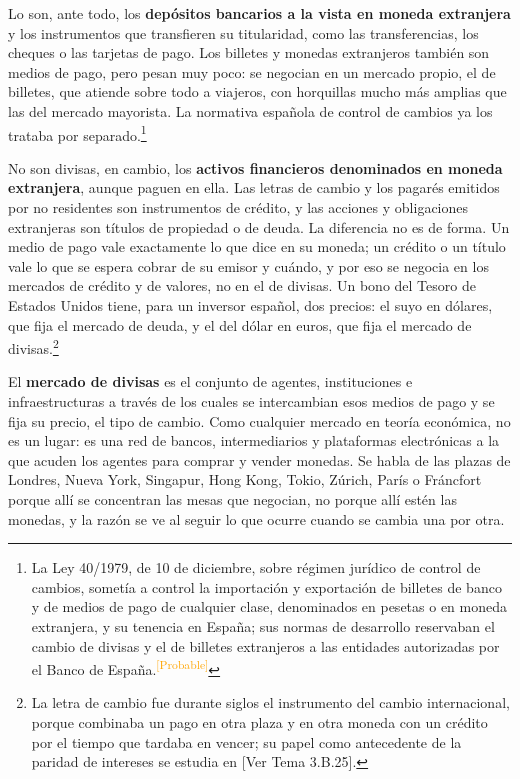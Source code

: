 \documentclass[10pt,a4paper]{article}
\newcommand{\authorfont}[1]{{\fontfamily{EBGaramond-TLF}\selectfont #1}}
\begin{document}
Lo son, ante todo, los \textbf{depósitos bancarios a la vista en moneda extranjera} y los instrumentos que transfieren su titularidad, como las transferencias, los cheques o las tarjetas de pago. Los billetes y monedas extranjeros también son medios de pago, pero pesan muy poco: se negocian en un mercado propio, el de billetes, que atiende sobre todo a viajeros, con horquillas mucho más amplias que las del mercado mayorista. La normativa española de control de cambios ya los trataba por separado.\footnote{%
    La Ley 40/1979, de 10 de diciembre, sobre régimen jurídico de control de cambios, sometía a control la importación y exportación de billetes de banco y de medios de pago de cualquier clase, denominados en pesetas o en moneda extranjera, y su tenencia en España; sus normas de desarrollo reservaban el cambio de divisas y el de billetes extranjeros a las entidades autorizadas por el Banco de España.\textcolor{orange}{\textsuperscript{[Probable]}}
}

No son divisas, en cambio, los \textbf{activos financieros denominados en moneda extranjera}, aunque paguen en ella. Las letras de cambio y los pagarés emitidos por no residentes son instrumentos de crédito, y las acciones y obligaciones extranjeras son títulos de propiedad o de deuda. La diferencia no es de forma. Un medio de pago vale exactamente lo que dice en su moneda; un crédito o un título vale lo que se espera cobrar de su emisor y cuándo, y por eso se negocia en los mercados de crédito y de valores, no en el de divisas. Un bono del Tesoro de Estados Unidos tiene, para un inversor español, dos precios: el suyo en dólares, que fija el mercado de deuda, y el del dólar en euros, que fija el mercado de divisas.\footnote{%
    La letra de cambio fue durante siglos el instrumento del cambio internacional, porque combinaba un pago en otra plaza y en otra moneda con un crédito por el tiempo que tardaba en vencer; su papel como antecedente de la paridad de intereses se estudia en [\authorfont{Ver Tema 3.B.25}].
}

El \textbf{mercado de divisas} es el conjunto de agentes, instituciones e infraestructuras a través de los cuales se intercambian esos medios de pago y se fija su precio, el tipo de cambio. Como cualquier mercado en teoría económica, no es un lugar: es una red de bancos, intermediarios y plataformas electrónicas a la que acuden los agentes para comprar y vender monedas. Se habla de las plazas de Londres, Nueva York, Singapur, Hong Kong, Tokio, Zúrich, París o Fráncfort porque allí se concentran las mesas que negocian, no porque allí estén las monedas, y la razón se ve al seguir lo que ocurre cuando se cambia una por otra.
\end{document}
